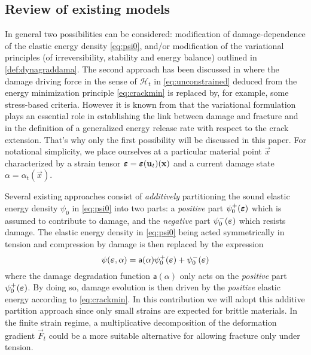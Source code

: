 \subsection{Review of existing models} \label{sec:reviewTC}
In general two possibilities can be considered: modification of damage-dependence of the elastic energy density \eqref{eq:psi0}, and/or modification of the variational principles (of irreversibility, stability and energy balance) outlined in \cref{def:dynagraddama}. The second approach has been discussed in \cite{LorentzKazymyrenko:2014,MieheSchaenzelUlmer:2015} where the damage driving force in the sense of $\mathcal{H}_t$ in \eqref{eq:unconstrained} deduced from the energy minimization principle \eqref{eq:crackmin} is replaced by, for example, some stress-based criteria. However it is known from \cite{SicsicMarigo:2013} that the variational formulation plays an essential role in establishing the link between damage and fracture and in the definition of a generalized energy release rate with respect to the crack extension. That's why only the first possibility will be discussed in this paper. For notational simplicity, we place ourselves at a particular material point $\vec{x}$ characterized by a strain tensor $\eps=\eps(\vec{u}_t)(\vec{x})$ and a current damage state $\alpha=\alpha_t(\vec{x})$.

Several existing approaches consist of \emph{additively} partitioning the sound elastic energy density $\psi_0$ in \eqref{eq:psi0} into two parts: a \emph{positive} part $\psi_0^+(\eps)$ which is assumed to contribute to damage, and the \emph{negative} part $\psi_0^-(\eps)$ which resists damage. The elastic energy density in \eqref{eq:psi0} being acted symmetrically in tension and compression by damage is then replaced by the expression
\begin{equation} \label{eq:elasticTC}
\psi(\eps,\alpha)=\mathsf{a}(\alpha)\psi_0^+(\eps)+\psi_0^-(\eps)
\end{equation}
where the damage degradation function $\mathsf{a}(\alpha)$ only acts on the \emph{positive} part $\psi_0^+(\eps)$. By doing so, damage evolution is then driven by the \emph{positive} elastic energy according to \eqref{eq:crackmin}. In this contribution we will adopt this additive partition approach since only small strains are expected for brittle materials. In the finite strain regime, a multiplicative decomposition of the deformation gradient $\vec{F}_t$ could be a more suitable alternative \cite{HeschWeinberg:2014} for allowing fracture only under tension.

